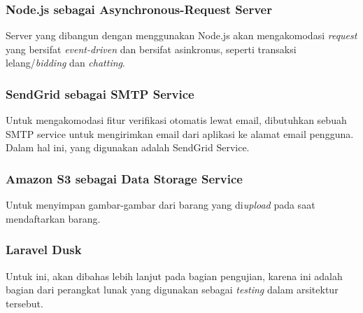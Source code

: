	\subsubsection{\textbf{Node.js} sebagai Asynchronous-Request Server}
    Server yang dibangun dengan menggunakan Node.js akan mengakomodasi \textit{request} yang bersifat \textit{event-driven} dan bersifat asinkronus, seperti transaksi lelang/\textit{bidding} dan \textit{chatting}.
    
    \subsubsection{\textbf{SendGrid} sebagai SMTP Service}
    Untuk mengakomodasi fitur verifikasi otomatis lewat email, dibutuhkan sebuah SMTP service untuk mengirimkan email dari aplikasi ke alamat email pengguna. Dalam hal ini, yang digunakan adalah SendGrid Service.
    
    \subsubsection{\textbf{Amazon S3} sebagai Data Storage Service}
    Untuk menyimpan gambar-gambar dari barang yang di\textit{upload} pada saat mendaftarkan barang.

	\subsubsection{\textbf{Laravel Dusk}}
	Untuk ini, akan dibahas lebih lanjut pada bagian pengujian, karena ini adalah bagian dari perangkat lunak yang digunakan sebagai \textit{testing} dalam arsitektur tersebut.
      
   \pagebreak
   
      
    